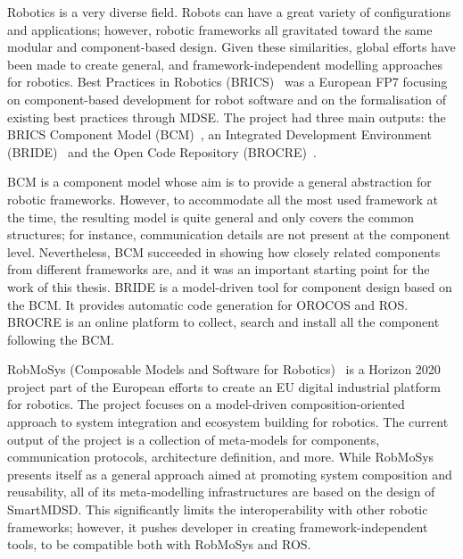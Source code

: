 Robotics is a very diverse field. Robots can have a great variety of configurations and applications; however, robotic frameworks all gravitated toward the same modular and component-based design. Given these similarities, global efforts have been made to create general, and framework-independent modelling approaches for robotics. Best Practices in Robotics (BRICS)~\cite{bischoff2010brics} was a European FP7 focusing on component-based development for robot software and on the formalisation of existing best practices through MDSE. The project had three main outputs: the BRICS Component Model (BCM)~\cite{bruyninckx2013brics}, an Integrated Development Environment (BRIDE)~\cite{bubeck2014bride} and the Open Code Repository (BROCRE)~\cite{kraetzschmar2010specifications}.

BCM is a component model whose aim is to provide a general abstraction for robotic frameworks. However, to accommodate all the most used framework at the time, the resulting model is quite general and only covers the common structures; for instance, communication details are not present at the component level. Nevertheless, BCM succeeded in showing how closely related components from different frameworks are, and it was an important starting point for the work of this thesis. BRIDE is a model-driven tool for component design based on the BCM. It provides automatic code generation for OROCOS and ROS. BROCRE is an online platform to collect, search and install all the component following the BCM.

RobMoSys (Composable Models and Software for Robotics)~\cite{robmosys} is a Horizon 2020 project part of the European efforts to create an EU digital industrial platform for robotics. The project focuses on a model-driven composition-oriented approach to system integration and ecosystem building for robotics. The current output of the project is a collection of meta-models for components, communication protocols, architecture definition, and more. While RobMoSys presents itself as a general approach aimed at promoting system composition and reusability, all of its meta-modelling infrastructures are based on the design of SmartMDSD. This significantly limits the interoperability with other robotic frameworks; however, it pushes developer in creating framework-independent tools, to be compatible both with RobMoSys and ROS.


